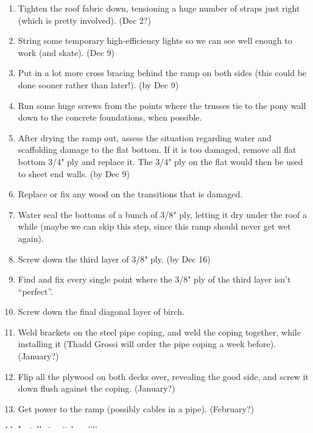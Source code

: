 \documentclass{article}
\begin{document}
\begin{enumerate}
\item Tighten the roof fabric down, tensioning a huge number of straps just right (which is pretty involved).  (Dec 2?)
\item String some temporary high-efficiency lights so we can see well enough to work (and skate). (Dec 9)
\item Put in a lot more cross bracing behind the ramp on both sides (this could be done sooner rather than later!). (by Dec 9)
\item Run some huge screws from the points where the trusses tie to
  the pony wall down to the concrete foundations, when possible.
\item After drying the ramp out, assess the situation regarding water and scaffolding damage to the flat bottom.  If it is too damaged, remove all flat bottom 3/4" ply and replace it.  The 3/4" ply on the flat would then be used to sheet end walls.  (by Dec 9)
\item Replace or fix any wood on the transitions that is damaged. 
\item Water seal the bottoms of a bunch of 3/8" ply, letting it dry under the roof a while (maybe we can skip this step, since this ramp should never get wet again).
\item Screw down the third layer of 3/8" ply. (by Dec 16)
\item Find and fix every single point where the 3/8" ply of the third layer isn't ``perfect''. 
\item Screw down the final diagonal layer of birch. 
\item Weld brackets on the steel pipe coping, and weld the coping together, while installing it (Thadd Grossi will order the pipe coping a week before). (January?)
\item Flip all the plywood on both decks over, revealing the good side, and screw it down flush against the coping.  (January?) 
\item Get power to the ramp (possibly cables in a pipe).   (February?)
\item Install circuit box (?)  
\item Install permanent lights. (February?)
\item Remove temporary lights.   (February?)
\item Sheet across the front of the pony wall on each deck.   (January?)
\item Install pool coping on extensions.   (January?)
\item Build a staircase on the southwest corner of the ramp.   (January?)
\item Build a staircase on the southeast corner of the ramp.    (January?)
\item Get an internet connection and setup some always-on webcams.  (February?)
\item Install a donations lock-box;   (February?)
\item Install a killer sound system.  (February?)
\end{enumerate}
\end{document}
